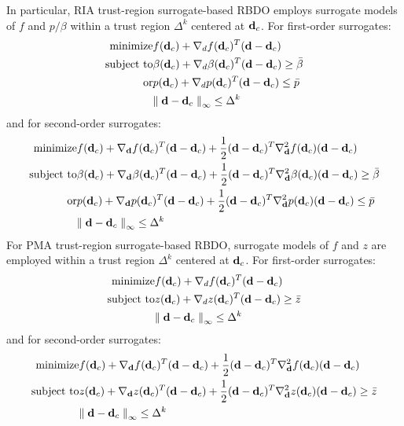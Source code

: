 In particular, RIA trust-region surrogate-based RBDO employs surrogate
models of $f$ and $p/\beta$ within a trust region $\Delta^k$ centered
at ${\bf d}_c$.  For first-order surrogates:
\begin{eqnarray}
  {\rm minimize }     & f({\bf d}_c) + \nabla_d f({\bf d}_c)^T
({\bf d} - {\bf d}_c) \nonumber \\
  {\rm subject \ to } & \beta({\bf d}_c) + \nabla_d \beta({\bf d}_c)^T
({\bf d} - {\bf d}_c) \ge \bar{\beta} \nonumber \\
  {\rm or }           & p ({\bf d}_c) + \nabla_d p({\bf d}_c)^T 
({\bf d} - {\bf d}_c) \le \bar{p} \nonumber \\
& {\parallel {\bf d} - {\bf d}_c \parallel}_\infty \le \Delta^k
\label{eq:rbdo_surr1_ria}
\end{eqnarray}
and for second-order surrogates:
\begin{eqnarray}
  {\rm minimize }     & f({\bf d}_c) + \nabla_{\bf d} f({\bf d}_c)^T
({\bf d} - {\bf d}_c)  + \frac{1}{2} ({\bf d} - {\bf d}_c)^T 
\nabla^2_{\bf d} f({\bf d}_c) ({\bf d} - {\bf d}_c) \nonumber \\
  {\rm subject \ to } & \beta({\bf d}_c) + \nabla_{\bf d} \beta({\bf d}_c)^T
({\bf d} - {\bf d}_c) + \frac{1}{2} ({\bf d} - {\bf d}_c)^T 
\nabla^2_{\bf d} \beta({\bf d}_c) ({\bf d} - {\bf d}_c) \ge \bar{\beta}
\nonumber \\
  {\rm or }           & p ({\bf d}_c) + \nabla_{\bf d} p({\bf d}_c)^T 
({\bf d} - {\bf d}_c) + \frac{1}{2} ({\bf d} - {\bf d}_c)^T 
\nabla^2_{\bf d} p({\bf d}_c) ({\bf d} - {\bf d}_c) \le \bar{p} \nonumber \\
& {\parallel {\bf d} - {\bf d}_c \parallel}_\infty \le \Delta^k
\label{eq:rbdo_surr2_ria}
\end{eqnarray}
For PMA trust-region surrogate-based RBDO, surrogate models of
$f$ and $z$ are employed within a trust region $\Delta^k$ centered 
at ${\bf d}_c$.  For first-order surrogates:
\begin{eqnarray}
  {\rm minimize }     & f({\bf d}_c) + \nabla_d f({\bf d}_c)^T
({\bf d} - {\bf d}_c) \nonumber \\
  {\rm subject \ to } & z({\bf d}_c) + \nabla_d z({\bf d}_c)^T ({\bf d} - {\bf d}_c) 
\ge \bar{z} \nonumber \\
& {\parallel {\bf d} - {\bf d}_c \parallel}_\infty \le \Delta^k
\label{eq:rbdo_surr1_pma}
\end{eqnarray}
and for second-order surrogates:
\begin{eqnarray}
  {\rm minimize }     & f({\bf d}_c) + \nabla_{\bf d} f({\bf d}_c)^T
({\bf d} - {\bf d}_c) + \frac{1}{2} ({\bf d} - {\bf d}_c)^T 
\nabla^2_{\bf d} f({\bf d}_c) ({\bf d} - {\bf d}_c) \nonumber \\
  {\rm subject \ to } & z({\bf d}_c) + \nabla_{\bf d} z({\bf d}_c)^T ({\bf d} - {\bf d}_c)
 + \frac{1}{2} ({\bf d} - {\bf d}_c)^T \nabla^2_{\bf d} z({\bf d}_c) 
({\bf d} - {\bf d}_c) \ge \bar{z} \nonumber \\
& {\parallel {\bf d} - {\bf d}_c \parallel}_\infty \le \Delta^k
\label{eq:rbdo_surr2_pma}
\end{eqnarray}
